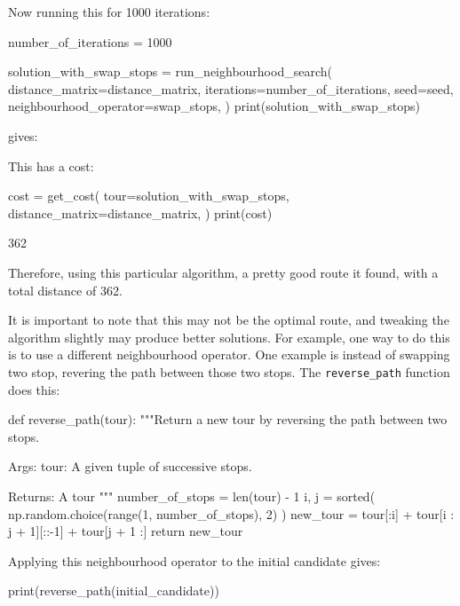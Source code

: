 Now running this for 1000 iterations:

\begin{pyin}
number_of_iterations = 1000

solution_with_swap_stops = run_neighbourhood_search(
    distance_matrix=distance_matrix,
    iterations=number_of_iterations,
    seed=seed,
    neighbourhood_operator=swap_stops,
)
print(solution_with_swap_stops)
\end{pyin}

gives:

\begin{pyout}
[0, 7, 2, 8, 5, 3, 1, 9, 12, 11, 4, 10, 6, 0]
\end{pyout}

This has a cost:

\begin{pyin}
cost = get_cost(
    tour=solution_with_swap_stops,
    distance_matrix=distance_matrix,
)
print(cost)
\end{pyin}

\begin{pyout}
362
\end{pyout}

Therefore, using this particular algorithm, a pretty good route it found, with a
total distance of 362.

It is important to note that this may not be the optimal route, and tweaking the
algorithm slightly may produce better solutions.
For example, one way to do this is to use a different neighbourhood operator.
One example is instead of swapping two stop, revering the path between those two
stops. The \texttt{reverse_path} function does this:

\begin{pyin}
def reverse_path(tour):
    """Return a new tour by reversing the path between two
    stops.

    Args:
        tour: A given tuple of successive stops.

    Returns:
        A tour
    """
    number_of_stops = len(tour) - 1
    i, j = sorted(
        np.random.choice(range(1, number_of_stops), 2)
    )
    new_tour = tour[:i] + tour[i : j + 1][::-1] + tour[j + 1 :]
    return new_tour
\end{pyin}

Applying this neighbourhood operator to the initial candidate gives:

\begin{pyin}
print(reverse_path(initial_candidate))
\end{pyin}

